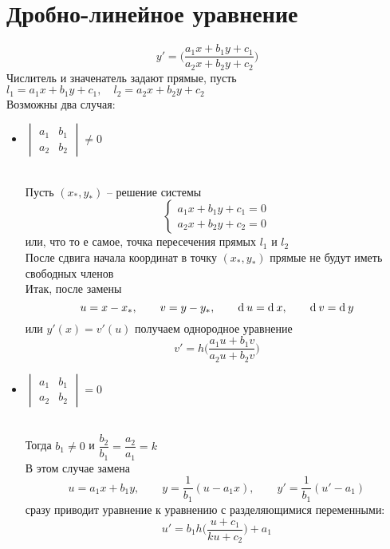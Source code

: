 \section{Дробно-линейное уравнение}

$$ y' = \bigg( \frac{a_1x + b_1y + c_1}{a_2x + b_2y + c_2} \bigg) $$
Числитель и значенатель задают прямые, пусть $ l_1 = a_1x + b_1y + c_1, \quad l_2 = a_2x + b_2y + c_2 $ \\
Возможны два случая:
\begin{itemize}
    \item $
    \begin{vmatrix}
        a_1 & b_1 \\
        a_2 & b_2
    \end{vmatrix} \ne 0 $
    \begin{figure}[!ht]
    \end{figure} \\
    Пусть $ (x_*, y_*) $ -- решение системы
    $$
    \begin{cases}
        a_1x + b_1y + c_1 = 0 \\
        a_2x + b_2y + c_2 = 0
    \end{cases} $$
    или, что то е самое, точка пересечения прямых $ l_1 $ и $ l_2 $ \\
    После сдвига начала координат в точку $ (x_*, y_*) $ прямые не будут иметь свободных членов \\
    Итак, после замены
    $$ u = x - x_*, \qquad v = y - y_*, \qquad \operatorname{d}^{} u = \operatorname{d}^{} x, \qquad \operatorname{d}^{} v = \operatorname{d}^{} y $$
    или $ y'(x) = v'(u) $ получаем однородное уравнение
    $$ v' = h \bigg( \frac{a_1u + b_1v}{a_2u + b_2v} \bigg) $$
    \item $
    \begin{vmatrix}
        a_1 & b_1 \\
        a_2 & b_2
    \end{vmatrix} = 0 $
    \begin{figure}[!ht]
    \end{figure} \\
    Тогда $ b_1 \ne 0 $ и $ \dfrac{b_2}{b_1} = \dfrac{a_2}{a_1} = k $ \\
    В этом случае замена
    $$ u = a_1x + b_1y, \qquad y = \frac1{b_1}(u - a_1x), \qquad y' = \frac1{b_1}(u' - a_1) $$
    сразу приводит уравнение к уравнению с разделяющимися переменными:
    $$ u' = b_1h \bigg( \frac{u + c_1}{ku + c_2} \bigg) + a_1 $$
\end{itemize}

